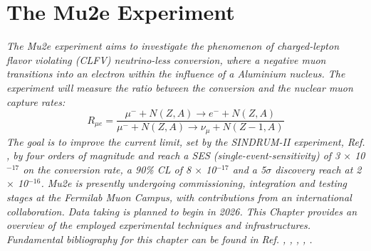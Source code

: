 \chapter{The Mu2e Experiment}\label{mu2echapter}
\textit{
The Mu2e experiment aims to investigate the phenomenon of charged-lepton flavor violating (CLFV) neutrino-less conversion, where a negative muon transitions into an electron within the influence of a Aluminium nucleus. The experiment will measure the ratio between the conversion and the nuclear muon capture rates:
\begin{equation}\label{rmue}
R_{\mu e}=\frac{\mu^{-}+N(Z, A) \rightarrow e^{-}+N(Z, A)}{\mu^{-}+N(Z, A) \rightarrow \nu_\mu+N(Z-1, A)}
\end{equation}
The goal is to improve the current limit, set by the SINDRUM-II experiment, Ref. \cite{SINDRUMII:2006dvw}, by
four orders of magnitude and reach a SES (single-event-sensitivity) of 3 $\times$ 10$^{-17}$ on the
conversion rate, a 90\% CL of 8 $\times$ 10$^{-17}$ and a 5$\sigma$ discovery reach at 2 $\times$ 10$^{-16}$.
Mu2e is presently undergoing commissioning, integration and testing stages at the Fermilab Muon Campus, 
with contributions from an international collaboration. Data taking is planned to begin in 2026. 
This Chapter provides an overview of the employed experimental techniques and infrastructures. 
Fundamental bibliography for this chapter can be found in Ref. \cite{bartoszek2015mu2e}, 
\cite{bobbb}, \cite{Bernstein_2013}, \cite{Kargiantoulakis_2020}, \cite{universe9010054}.}
